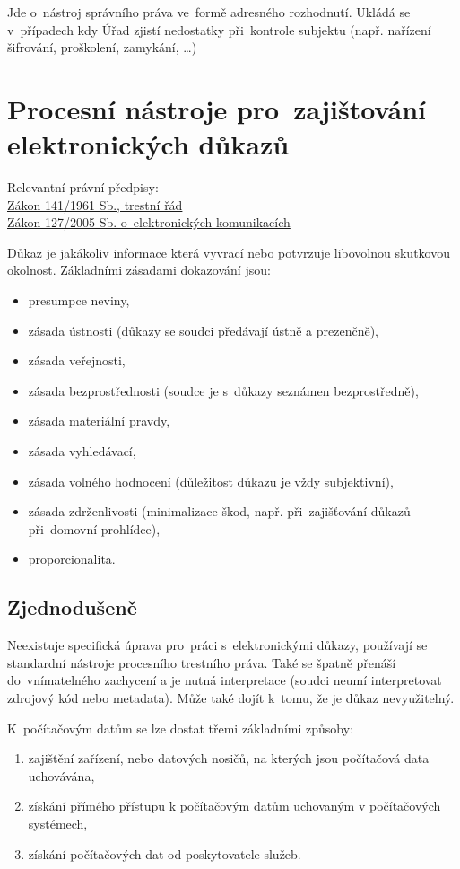 Jde o~nástroj správního práva ve~formě adresného rozhodnutí.
Ukládá se v~případech kdy Úřad zjistí nedostatky při~kontrole subjektu (např. nařízení šifrování, proškolení, zamykání, \dots)


\clearpage
\section{Procesní nástroje pro~zajištování elektronických důkazů}

{}Relevantní právní předpisy:
\\\href{https://www.zakonyprolidi.cz/cs/1961-141}{Zákon 141/1961 Sb., trestní řád}
\\\href{https://www.zakonyprolidi.cz/cs/2005-127}{Zákon 127/2005 Sb. o~elektronických komunikacích}

Důkaz je jakákoliv informace která vyvrací nebo potvrzuje libovolnou skutkovou okolnost.
Základními zásadami dokazování jsou:
\vspace*{-1em}\begin{itemize}
\item presumpce neviny,
\item zásada ústnosti (důkazy se soudci předávají ústně a prezenčně),
\item zásada veřejnosti,
\item zásada bezprostřednosti (soudce je s~důkazy seznámen bezprostředně),
\item zásada materiální pravdy,
\item zásada vyhledávací,
\item zásada volného hodnocení (důležitost důkazu je vždy subjektivní),
\item zásada zdrženlivosti (minimalizace škod, např. při~zajišťování důkazů při~domovní prohlídce),
\item proporcionalita.
\end{itemize}

\subsection{Zjednodušeně}

Neexistuje specifická úprava pro~práci s~elektronickými důkazy, používají se standardní nástroje procesního trestního práva.
Také se špatně přenáší do~vnímatelného zachycení a je nutná interpretace (soudci neumí interpretovat zdrojový kód nebo metadata).
Může také dojít k~tomu, že je důkaz nevyužitelný.

K~počítačovým datům se lze dostat třemi základními způsoby:
\begin{enumerate}[label=\alph*)]
    \item zajištění zařízení, nebo datových nosičů, na kterých jsou počítačová data uchovávána,
    \item získání přímého přístupu k počítačovým datům uchovaným v počítačových systémech,
    \item získání počítačových dat od poskytovatele služeb.
\end{enumerate}

